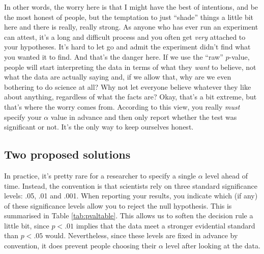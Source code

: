 \documentclass[
]{book}
\begin{document}
In other words, the worry here is that I might have the best of intentions, and be the most honest of people, but the temptation to just ``shade'' things a little bit here and there is really, really strong. As anyone who has ever run an experiment can attest, it's a long and difficult process and you often get \emph{very} attached to your hypotheses. It's hard to let go and admit the experiment didn't find what you wanted it to find. And that's the danger here. If we use the ``raw'' \(p\)-value, people will start interpreting the data in terms of what they \emph{want} to believe, not what the data are actually saying and, if we allow that, why are we even bothering to do science at all? Why not let everyone believe whatever they like about anything, regardless of what the facts are? Okay, that's a bit extreme, but that's where the worry comes from. According to this view, you really \emph{must} specify your \(\alpha\) value in advance and then only report whether the test was significant or not. It's the only way to keep ourselves honest.

\hypertarget{two-proposed-solutions}{%
\subsection{Two proposed solutions}\label{two-proposed-solutions}}

In practice, it's pretty rare for a researcher to specify a single \(\alpha\) level ahead of time. Instead, the convention is that scientists rely on three standard significance levels: .05, .01 and .001. When reporting your results, you indicate which (if any) of these significance levels allow you to reject the null hypothesis. This is summarised in Table \ref{tab:pvaltable}. This allows us to soften the decision rule a little bit, since \(p<.01\) implies that the data meet a stronger evidential standard than \(p<.05\) would. Nevertheless, since these levels are fixed in advance by convention, it does prevent people choosing their \(\alpha\) level after looking at the data.
\end{document}
